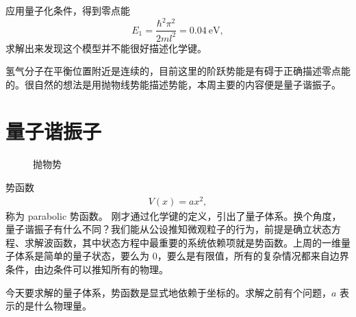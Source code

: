 应用量子化条件，得到零点能
\begin{equation}
    E_1 = \frac{\hbar^2\pi^2}{2ml^2} = \SI{0.04}{\electronvolt},
\end{equation}
求解出来发现这个模型并不能很好描述化学键。

氢气分子在平衡位置附近是连续的，目前这里的阶跃势能是有碍于正确描述零点能的。很自然的想法是用抛物线势能描述势能，本周主要的内容便是量子谐振子。
\chapter{量子谐振子}
\begin{figure}[tp]\centering
    \caption{抛物势}
\end{figure}
势函数
\begin{align}
    V(x) = a x^2,
\end{align}
称为 parabolic 势函数。
刚才通过化学键的定义，引出了量子体系。换个角度，量子谐振子有什么不同？我们能从公设推知微观粒子的行为，前提是确立状态方程、求解波函数，其中状态方程中最重要的系统依赖项就是势函数。上周的一维量子体系是简单的量子状态，要么为 0，要么是有限值，所有的复杂情况都来自边界条件，由边条件可以推知所有的物理。

今天要求解的量子体系，势函数是显式地依赖于坐标的。求解之前有个问题，$a$ 表示的是什么物理量。


